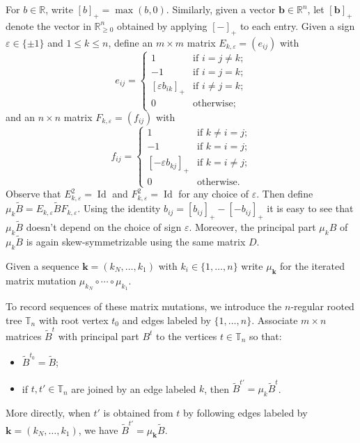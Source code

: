 \documentclass{amsart}
\numberwithin{theorem}{section}
\newcommand{\bfb}{\boldsymbol{b}}
\newcommand{\bfk}{{\boldsymbol{k}}}
\newcommand{\RR}{\mathbb{R}}
\newcommand{\TT}{\mathbb{T}}
\newcommand{\Id}{\operatorname{Id}}
\begin{document}
  For $b\in\RR$, write $[b]_+=\max(b,0)$.
  Similarly, given a vector $\bfb\in\RR^n$, let $[\bfb]_+$ denote the vector in $\RR_{\ge0}^n$ obtained by applying $[-]_+$ to each entry.
  Given a sign $\varepsilon\in\{\pm1\}$ and $1\le k\le n$, define an $m\times m$ matrix $E_{k,\varepsilon}=(e_{ij})$ with
  \begin{equation}
    \label{eq:left mutation matrix}
    e_{ij}=\begin{cases} 1 & \text{if $i=j\ne k$;}\\ -1 & \text{if $i=j=k$;}\\ [\varepsilon b_{ik}]_+ & \text{if $i\ne j=k$;}\\ 0 & \text{otherwise;} \end{cases}
  \end{equation}
  and an $n\times n$ matrix $F_{k,\varepsilon}=(f_{ij})$ with
  \begin{equation}
    \label{eq:right mutation matrix}
    f_{ij}=\begin{cases} 1 & \text{if $k\ne i=j$;}\\ -1 & \text{if $k=i=j$;}\\ [-\varepsilon b_{kj}]_+ & \text{if $k=i\ne j$;}\\ 0 & \text{otherwise.} \end{cases}
  \end{equation}
  Observe that $E^2_{k,\varepsilon}=\Id$ and $F^2_{k,\varepsilon}=\Id$ for any choice of $\varepsilon$.
  Then define $\mu_k\tilde B=E_{k,\varepsilon} \tilde B F_{k,\varepsilon}$.
  Using the identity $b_{ij}=[b_{ij}]_+-[-b_{ij}]_+$ it is easy to see that $\mu_k\tilde B$ doesn't depend on the choice of sign $\varepsilon$.
  Moreover, the principal part $\mu_k B$ of $\mu_k\tilde B$ is again skew-symmetrizable using the same matrix $D$.

  Given a sequence $\bfk=(k_N,\ldots,k_1)$ with $k_i\in\{1,\ldots,n\}$ write $\mu_\bfk$ for the iterated matrix mutation $\mu_{k_N}\circ\cdots\circ\mu_{k_1}$.


  To record sequences of these matrix mutations, we introduce the $n$-regular rooted tree $\TT_n$ with root vertex $t_0$ and edges labeled by $\{1,\ldots,n\}$.
  Associate $m\times n$ matrices $\tilde{B}^t$ with principal part $B^t$ to the vertices $t\in\TT_n$ so that:
  \begin{itemize}
    \item $\tilde{B}^{t_0}=\tilde{B}$;
    \item if $t,t'\in\TT_n$ are joined by an edge labeled $k$, then $\tilde{B}^{t'}=\mu_k \tilde{B}^t$.
  \end{itemize}
  More directly, when $t'$ is obtained from $t$ by following edges labeled by $\bfk=(k_N,\ldots,k_1)$, we have $\tilde B^{t'}=\mu_\bfk \tilde B$.
\end{document}
